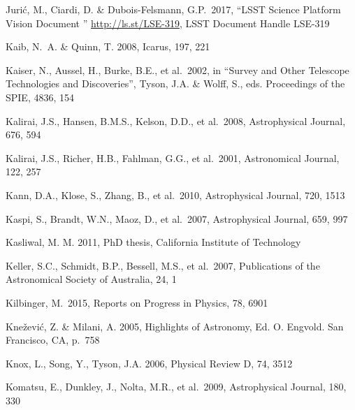 \documentclass[twocolumn]{aastex61}
\begin{document}
\begin{thebibliography}{}
 Juri\'{c}, M., Ciardi, D. \& Dubois-Felsmann, G.P.~2017, ``LSST Science Platform Vision Document '' \url{http://ls.st/LSE-319}, LSST Document Handle LSE-319

 Kaib, N.~A. \& Quinn, T. 2008, Icarus, 197, 221

 Kaiser, N., Aussel, H., Burke, B.E., et al.~2002, in ``Survey and Other Telescope Technologies and Discoveries'', Tyson, J.A. \& Wolff, S., eds. Proceedings of the SPIE, 4836, 154

 Kalirai, J.S., Hansen, B.M.S., Kelson, D.D., et al.~2008, Astrophysical Journal, 676, 594

 Kalirai, J.S., Richer, H.B., Fahlman, G.G., et al.~2001, Astronomical Journal, 122, 257


 Kann, D.A., Klose, S., Zhang, B., et al.~2010, Astrophysical Journal, 720, 1513


 Kaspi, S., Brandt, W.N., Maoz, D., et al.~2007, Astrophysical Journal, 659, 997

 Kasliwal, M. M. 2011, PhD thesis, California Institute of Technology

 Keller, S.C., Schmidt, B.P., Bessell, M.S., et al.~2007, Publications of the Astronomical Society of Australia, 24, 1

 Kilbinger, M.~2015, Reports on Progress in Physics, 78, 6901

 Kne\v{z}evi\'{c}, Z. \& Milani, A. 2005, Highlights of Astronomy, Ed. O. Engvold. San Francisco, CA, p.~758

 Knox, L., Song, Y., Tyson, J.A. 2006, Physical Review D, 74, 3512

 Komatsu, E., Dunkley, J., Nolta, M.R., et al.~2009, Astrophysical Journal, 180, 330


\end{thebibliography}
\end{document}
